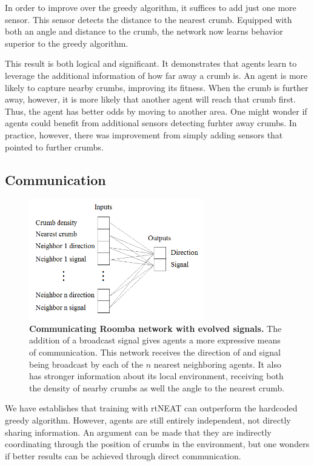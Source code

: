\documentclass[conference]{IEEEtran}
\begin{document}
In order to improve over the greedy algorithm, it suffices to add just one more sensor. This sensor detects the distance to the nearest crumb. Equipped with both an angle and distance to the crumb, the network now learns behavior superior to the greedy algorithm.

This result is both logical and significant. It demonstrates that agents learn to leverage the additional information of how far away a crumb is. An agent is more likely to capture nearby crumbs, improving its fitness. When the crumb is further away, however, it is more likely that another agent will reach that crumb first. Thus, the agent has better odds by moving to another area. 
One might wonder if agents could benefit from additional sensors detecting furhter away crumbs. In practice, however, there was improvement from simply adding sensors that pointed to further crumbs.


\subsection{Communication}

\begin{figure}[t]
\centering
\includegraphics[width=3.0in]{./figures/neroevolution/emerg_comm_network.png}
\caption{\textbf{Communicating Roomba network with evolved signals.} The addition of a broadcast signal gives agents a more expressive means of communication. This network receives the direction of and signal being broadcast by each of the $n$ nearest neighboring agents. It also has stronger information about its local environment, receiving both the density of nearby crumbs as well the angle to the nearest crumb.  }
\label{neroevolution:evolved_comunication}
\end{figure}




We have establishes that training with rtNEAT can outperform the hardcoded greedy algorithm. However, agents are still entirely independent, not directly sharing information. An argument can be made that they are indirectly coordinating through the position of crumbs in the environment, but one wonders if better results can be achieved through direct communication.
\end{document}
